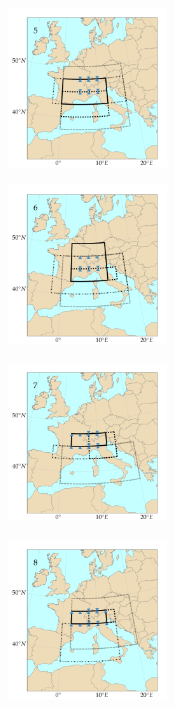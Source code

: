 \documentclass[5p]{elsarticle}
\begin{document}
\begin{figure}[htb]
\begin{subfigure}{.5\columnwidth}
	\end{subfigure}
	\begin{subfigure}{.5\columnwidth}
		\centering
		\includegraphics[width=4.2cm]{figures/spatial_win_z4-hi2/Spatial_windows_5.png}
	\end{subfigure}%
	\begin{subfigure}{.5\columnwidth}
		\centering
		\includegraphics[width=4.2cm]{figures/spatial_win_z4-hi2/Spatial_windows_6.png}
	\end{subfigure}
	\begin{subfigure}{.5\columnwidth}
		\centering
		\includegraphics[width=4.2cm]{figures/spatial_win_z4-hi2/Spatial_windows_7.png}
	\end{subfigure}%
	\begin{subfigure}{.5\columnwidth}
		\centering
		\includegraphics[width=4.2cm]{figures/spatial_win_z4-hi2/Spatial_windows_8.png}

\end{subfigure}
\end{figure}
\end{document}
